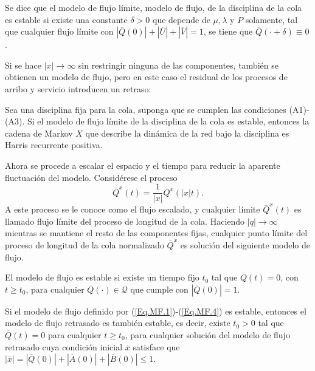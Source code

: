 \begin{Def}
Se dice que el modelo de flujo l\'imite, modelo de flujo, de la
disciplina de la cola es estable si existe una constante
$\delta>0$ que depende de $\mu,\lambda$ y $P$ solamente, tal que
cualquier flujo l\'imite con
$|\overline{Q}\left(0\right)|+|\overline{U}|+|\overline{V}|=1$, se
tiene que $\overline{Q}\left(\cdot+\delta\right)\equiv0$.
\end{Def}

Si se hace $|x|\rightarrow\infty$ sin restringir ninguna de las
componentes, tambi\'en se obtienen un modelo de flujo, pero en
este caso el residual de los procesos de arribo y servicio
introducen un retraso:
\begin{Teo}\label{Tma.4.2.Dai}
Sea una disciplina fija para la cola, suponga que se cumplen las
condiciones (A1)-(A3). Si el modelo de flujo l\'imite de la
disciplina de la cola es estable, entonces la cadena de Markov $X$
que describe la din\'amica de la red bajo la disciplina es Harris
recurrente positiva.
\end{Teo}

Ahora se procede a escalar el espacio y el tiempo para reducir la
aparente fluctuaci\'on del modelo. Consid\'erese el proceso
\begin{equation}\label{Eq.3.7}
\overline{Q}^{x}\left(t\right)=\frac{1}{|x|}Q^{x}\left(|x|t\right).
\end{equation}
A este proceso se le conoce como el flujo escalado, y cualquier
l\'imite $\overline{Q}^{x}\left(t\right)$ es llamado flujo
l\'imite del proceso de longitud de la cola. Haciendo
$|q|\rightarrow\infty$ mientras se mantiene el resto de las
componentes fijas, cualquier punto l\'imite del proceso de
longitud de la cola normalizado $\overline{Q}^{x}$ es soluci\'on
del siguiente modelo de flujo.


\begin{Def}
El modelo de flujo es estable si existe un tiempo fijo $t_{0}$ tal
que $\overline{Q}\left(t\right)=0$, con $t\geq t_{0}$, para
cualquier $\overline{Q}\left(\cdot\right)\in\mathcal{Q}$ que
cumple con $|\overline{Q}\left(0\right)|=1$.
\end{Def}

\begin{Lemma}
Si el modelo de flujo definido por (\ref{Eq.MF.1})-(\ref{Eq.MF.4})
es estable, entonces el modelo de flujo retrasado es tambi\'en
estable, es decir, existe $t_{0}>0$ tal que
$\overline{Q}\left(t\right)=0$ para cualquier $t\geq t_{0}$, para
cualquier soluci\'on del modelo de flujo retrasado cuya
condici\'on inicial $\overline{x}$ satisface que
$|\overline{x}|=|\overline{Q}\left(0\right)|+|\overline{A}\left(0\right)|+|\overline{B}\left(0\right)|\leq1$.
\end{Lemma}


